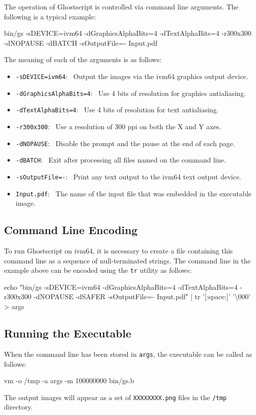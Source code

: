 \documentclass[a4paper,11pt]{article}
\newcommand{\code}[1]{\texttt{#1}}
\newenvironment{codeblock}{\begin{trivlist}\ttfamily
  \item }{\end{trivlist}}
\begin{document}
The operation of Ghostscript is controlled via command line arguments.
The following is a typical example:
\begin{codeblock}
bin/gs -sDEVICE=ivm64 -dGraphicsAlphaBits=4 -dTextAlphaBits=4 -r300x300 -dNOPAUSE -dBATCH -sOutputFile=- Input.pdf
\end{codeblock}
The meaning of each of the arguments is as follows:
\begin{itemize}
\item \code{-sDEVICE=ivm64}:~ Output the images via the ivm64 graphics output device.
\item \code{-dGraphicsAlphaBits=4}:~ Use 4 bits of resolution for graphics antialiasing.
\item \code{-dTextAlphaBits=4}:~ Use 4 bits of resolution for text antialiasing.
\item \code{-r300x300}:~ Use a resolution of 300 ppi on both the X and Y axes.
\item \code{-dNOPAUSE}:~ Disable the prompt and the pause at the end of each page.
\item \code{-dBATCH}:~ Exit after processing all files named on the command line.
\item \code{-sOutputFile=-}:~ Print any text output to the ivm64 text output device.
\item \code{Input.pdf}:~ The name of the input file that was embedded in the executable image.
\end{itemize}

\subsection{Command Line Encoding}

To run Ghostscript on ivm64, it is necessary to create a file containing this command line as a sequence of null-terminated strings.
The command line in the example above can be encoded using the \code{tr} utility as follows:
\begin{codeblock}
echo "bin/gs -sDEVICE=ivm64 -dGraphicsAlphaBits=4 -dTextAlphaBits=4 -r300x300 -dNOPAUSE -dSAFER -sOutputFile=- Input.pdf" | tr '[:space:]' '\textbackslash 000' > args
\end{codeblock}

\subsection{Running the Executable}

When the command line has been stored in \code{args}, the executable can be called as follows:
\begin{codeblock}
  vm -o /tmp -a args -m 100000000 bin/gs.b
\end{codeblock}
The output images will appear as a set of \code{XXXXXXXX.png} files in the \code{/tmp} directory.
\end{document}
